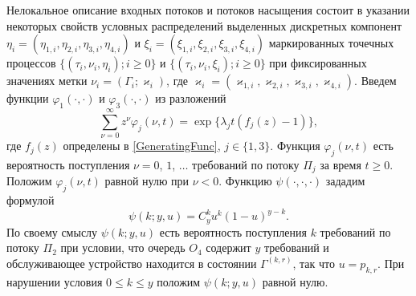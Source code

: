 \documentclass[a4paper,12pt,russian]{extarticle}
\newcommand{\ga}[1]{\Gamma^{\left( #1 \right)} }
\begin{document}
Нелокальное описание входных потоков и потоков насыщения состоит в указании некоторых свойств условных распределений выделенных дискретных компонент $\eta_i=(\eta_{1,i},\eta_{2,i}, \eta_{3,i}, \eta_{4,i})$ и $\xi_i=(\xi_{1,i}, \xi_{2,i}, \xi_{3,i}, \xi_{4,i})$ маркированных точечных процессов \linebreak $\{(\tau_i, \nu_i, \eta_i); i\geqslant 0\}$ и $\{(\tau_i, \nu_i, \xi_i); i\geqslant 0\}$ при фиксированных значениях метки $\nu_i = (\Gamma_i;\varkappa_i)$, где $\varkappa_i=(\varkappa_{1,i},\varkappa_{2,i},\varkappa_{3,i},\varkappa_{4,i})$. 
Введем функции $\varphi_1(\cdot,\cdot)$ и $\varphi_3(\cdot,\cdot)$ из разложений 
\begin{equation*}
\sum_{\nu=0}^{\infty} z^\nu\varphi_j(\nu,t) = \exp\{\lambda_j t (f_j(z)-1)\},
\end{equation*}
где $f_j(z)$ определены в \eqref{GeneratingFunc}, $j \in \{1,3\}$. Функция $\varphi_j(\nu,t)$ есть вероятность поступления $\nu=0$, $1$, $\ldots$ требований по потоку $\Pi_j$ за время $t \geqslant 0$. Положим $\varphi_j(\nu,t)$ равной нулю при $\nu < 0$. Функцию $\psi(\cdot,\cdot,\cdot)$ зададим формулой
\begin{equation*}
\psi(k;y,u)=C_y^k u^k (1-u)^{y-k}.	
\end{equation*}
По своему смыслу $\psi(k;y,u)$ есть вероятность поступления $k$ требований по потоку $\Pi_2$ при условии, что очередь $O_4$ содержит $y$ требований и обслуживающее устройство находится в состоянии $\ga{k,r}$, так что $u=p_{k,r}$. При нарушении условия $ 0\leqslant k \leqslant y$ положим $\psi(k;y,u)$ равной нулю.
\end{document}
